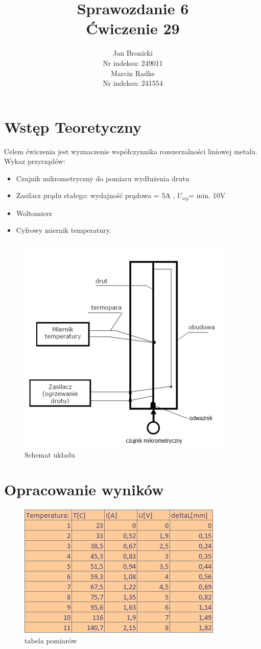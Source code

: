 \documentclass{article}
\title{Sprawozdanie 6\\ Ćwiczenie 29}
\author{Jan Bronicki \\
Nr indeksu: 249011\\
Marcin Radke\\
Nr indeksu: 241554}
\date{}
\begin{document}
\maketitle

\section{Wstęp Teoretyczny}
Celem ćwiczenia jest wyznaczenie współczynnika rozszerzalności liniowej metalu.\\
Wykaz przyrządów:
\begin{itemize}
    \item Czujnik mikrometryczny do pomiaru wydłużenia drutu
    \item Zasilacz prądu stałego: wydajność prądowa = 5A , $U_{wy}$= min. 10V
    \item Woltomierz
    \item Cyfrowy miernik temperatury.
\end{itemize}


\begin{figure}[h!]
    \centering
    \includegraphics[scale=0.9]{xd.PNG}
    \caption{Schemat układu}
\end{figure}

\section{Opracowanie wyników}
\begin{figure}[h!]
    \centering
    \includegraphics[scale=0.9]{wykresik.PNG}
    \caption{tabela pomiarów}
\end{figure}
\end{document}
